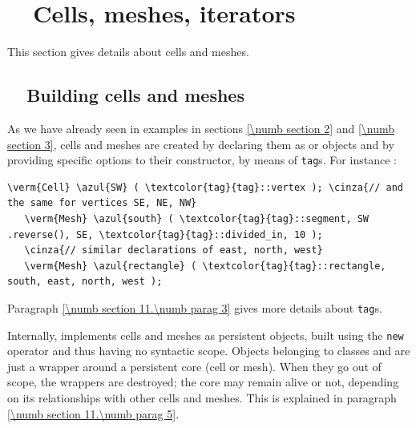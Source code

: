 
\chapter{~~Cells, meshes, iterators}\label{\numb section 9}


This section gives details about cells and meshes.

\section{~~Building cells and meshes}\label{\numb section 9.\numb parag 1}

As we have already seen in examples in sections \ref{\numb section 2} and \ref{\numb section 3},
cells and meshes are created by declaring them as {\small\tt {}} or
{\small\tt {}} objects
and by providing specific options to their constructor, by means of {\small\tt\textcolor{tag}{tag}}s.
For instance :

\begin{Verbatim}[commandchars=\\\{\},formatcom=\small\tt,
   baselinestretch=0.94,framesep=2mm                      ]
   \verm{Cell} \azul{SW} ( \textcolor{tag}{tag}::vertex ); \cinza{// and the same for vertices SE, NE, NW}
   \verm{Mesh} \azul{south} ( \textcolor{tag}{tag}::segment, SW .reverse(), SE, \textcolor{tag}{tag}::divided_in, 10 );
   \cinza{// similar declarations of east, north, west}
   \verm{Mesh} \azul{rectangle} ( \textcolor{tag}{tag}::rectangle, south, east, north, west );
\end{Verbatim}

Paragraph \ref{\numb section 11.\numb parag 3} gives more details about {\small\tt\textcolor{tag}{tag}}s.

Internally, {\maniFEM} implements cells and meshes as persistent objects, built
using the {\small\tt new} operator and thus having no syntactic scope.
Objects belonging to classes {\small\tt {}} and {\small\tt {}} are just a wrapper
around a persistent core (cell or mesh).
When they go out of scope, the wrappers are destroyed; the core may remain alive or not,
depending on its relationships with other cells and meshes.
This is explained in paragraph \ref{\numb section 11.\numb parag 5}.

